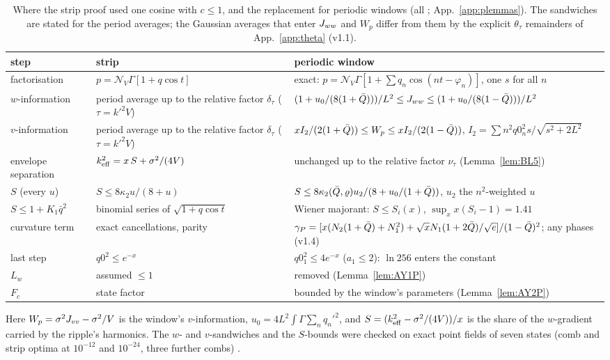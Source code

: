 \begin{table}
\caption{Where the strip proof used one cosine with $c\le1$, and the replacement for periodic windows (all \proofst; App.~\ref{app:plemmas}). The sandwiches are stated for the period averages; the Gaussian averages that enter $J_{ww}$ and $W_p$ differ from them by the explicit $\theta_\tau$ remainders of App.~\ref{app:theta} (v1.1).}
\label{tab:replace}
\begin{ruledtabular}
\begin{tabular}{p{}p{}p{}}
step & strip & periodic window\\ \hline
factorisation & $p=\mathcal N_V\Gamma[1+q\cos t]$ & exact: $p=\mathcal N_V\Gamma[1+\sum q_n\cos(nt-\varphi_n)]$, one $s$ for all $n$\\
$w$-information & period average up to the relative factor $\delta_\tau$ ($\tau=k'^2V$) & $(1+u_0/(8(1+\bar Q)))/L^2\le J_{ww}\le(1+u_0/(8(1-\bar Q)))/L^2$\\
$v$-information & period average up to the relative factor $\delta_\tau$ ($\tau=k'^2V$) & $xI_2/(2(1+\bar Q))\le W_p\le xI_2/(2(1-\bar Q))$, $I_2=\sum n^2q0_n^2s/\sqrt{s^2+2L^2}$\\
envelope separation & $k_{\mathrm{eff}}^2=x\,S+\sigma^2/(4V)$ & unchanged up to the relative factor $\nu_\tau$ (Lemma~\ref{lem:BL5})\\
$S$ (every $u$) & $S\le8\kappa_2u/(8+u)$ & $S\le8\kappa_2(\bar Q,\varrho)u_2/(8+u_0/(1+\bar Q))$, $u_2$ the $n^2$-weighted $u$\\
$S\le1+K_1\bar q^2$ & binomial series of $\sqrt{1+q\cos t}$ & Wiener majorant: $S\le S_i(x)$, $\sup_x x(S_i-1)=1.41$\\
curvature term & exact cancellations, parity & $\gamma_P=[x(N_2(1+\bar Q)+N_1^2)+\sqrt xN_1(1+2\bar Q)/\sqrt e]/(1-\bar Q)^2$; any phases (v1.4)\\
last step & $q0^2\le e^{-x}$ & $q0_1^2\le4e^{-x}$ ($a_1\le2$): $\ln256$ enters the constant\\
$L_w$ & assumed $\le1$ & removed (Lemma~\ref{lem:AY1P})\\
$F_c$ & state factor & bounded by the window's parameters (Lemma~\ref{lem:AY2P})\\
\end{tabular}
\end{ruledtabular}
\end{table}

Here $W_p=\sigma^2J_{vv}-\sigma^2/V$ is the window's $v$-information, $u_0=4L^2\int\Gamma\sum_nq_n'^2$, and $S=(k_{\mathrm{eff}}^2-\sigma^2/(4V))/x$ is the share of
the $w$-gradient carried by the ripple's harmonics. The $w$- and $v$-sandwiches and the $S$-bounds were checked on exact point fields of
seven states (comb and strip optima at $10^{-12}$ and $10^{-24}$, three further combs) \numst.

